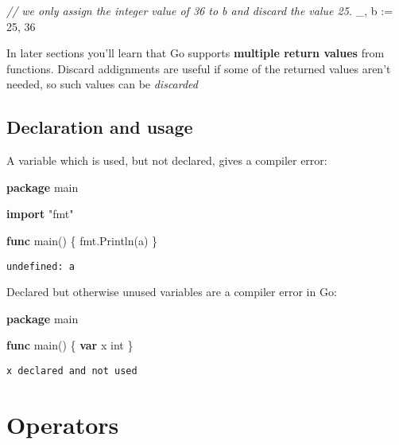 \documentclass[]{book}
\newenvironment{Shaded}{\begin{snugshade}}{\end{snugshade}}
\newcommand{\CommentTok}[1]{\textcolor[rgb]{0.56,0.35,0.01}{\textit{#1}}}
\newcommand{\DataTypeTok}[1]{\textcolor[rgb]{0.13,0.29,0.53}{#1}}
\newcommand{\DecValTok}[1]{\textcolor[rgb]{0.00,0.00,0.81}{#1}}
\newcommand{\KeywordTok}[1]{\textcolor[rgb]{0.13,0.29,0.53}{\textbf{#1}}}
\newcommand{\NormalTok}[1]{#1}
\newcommand{\StringTok}[1]{\textcolor[rgb]{0.31,0.60,0.02}{#1}}
\let\BeginKnitrBlock\begin \let\EndKnitrBlock\end
\begin{document}
\begin{Shaded}
\begin{Highlighting}[]
\CommentTok{// we only assign the integer value of 36 to b and discard the value 25.}
\NormalTok{_, b := }\DecValTok{25}\NormalTok{, }\DecValTok{36}
\end{Highlighting}
\end{Shaded}

\BeginKnitrBlock{rmdnote}
In later sections you'll learn that Go supports \textbf{multiple return values} from
functions. Discard addignments are useful if some of the returned values aren't
needed, so such values can be \emph{discarded}
\EndKnitrBlock{rmdnote}

\hypertarget{declaration-and-usage}{%
\subsection{Declaration and usage}\label{declaration-and-usage}}

A variable which is used, but not declared, gives a compiler error:

\begin{Shaded}
\begin{Highlighting}[]
\KeywordTok{package}\NormalTok{ main}

\KeywordTok{import} \StringTok{"fmt"}

\KeywordTok{func}\NormalTok{ main() \{}
\NormalTok{    fmt.Println(a)}
\NormalTok{\}}
\end{Highlighting}
\end{Shaded}

\begin{verbatim}
undefined: a
\end{verbatim}

Declared but otherwise unused variables are a compiler error in Go:

\begin{Shaded}
\begin{Highlighting}[]
\KeywordTok{package}\NormalTok{ main}

\KeywordTok{func}\NormalTok{ main() \{}
    \KeywordTok{var}\NormalTok{ x }\DataTypeTok{int}
\NormalTok{\}}
\end{Highlighting}
\end{Shaded}

\begin{verbatim}
x declared and not used
\end{verbatim}

\hypertarget{operators}{%
\section{Operators}\label{operators}}
\end{document}

